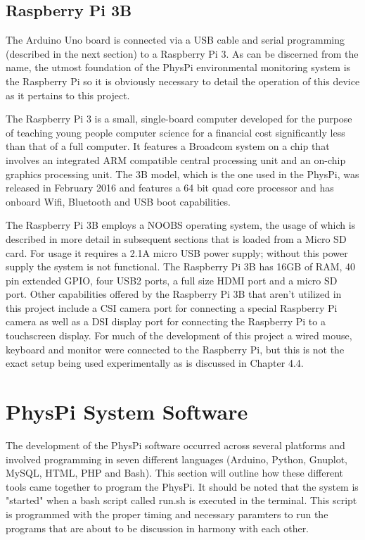 \documentclass[letterpaper, 11pt]{report}
\begin{document}
\subsection{Raspberry Pi 3B}

The Arduino Uno board is connected via a USB cable and serial programming (described in the next section) to a Raspberry Pi 3.  As can be discerned from the name, the utmost foundation of the PhysPi environmental monitoring system is the Raspberry Pi so it is obviously necessary to detail the operation of this device as it pertains to this project.

The Raspberry Pi 3 is a small, single-board computer developed for the purpose of teaching young people computer science for a financial cost significantly less than that of a full computer.  It features a Broadcom system on a chip that involves an integrated ARM compatible central processing unit and an on-chip graphics processing unit.  The 3B model, which is the one used in the PhysPi, was released in February 2016 and features a 64 bit quad core processor and has onboard Wifi, Bluetooth and USB boot capabilities. 

The Raspberry Pi 3B employs a NOOBS operating system, the usage of which is described in more detail in subsequent sections that is loaded from a Micro SD card.  For usage it requires a 2.1A micro USB power supply; without this power supply the system is not functional. The Raspberry Pi 3B has 16GB of RAM, 40 pin extended GPIO, four USB2 ports, a full size HDMI port and a micro SD port.  Other capabilities offered by the Raspberry Pi 3B that aren't utilized in this project include a CSI camera port for connecting a special Raspberry Pi camera as well as a DSI display port for connecting the Raspberry Pi to a touchscreen display.  For much of the development of this project a wired mouse, keyboard and monitor were connected to the Raspberry Pi, but this is not the exact setup being used experimentally as is discussed in Chapter 4.4.

\section{PhysPi System Software}

The development of the PhysPi software occurred across several platforms and involved programming in seven different languages (Arduino, Python, Gnuplot, MySQL, HTML, PHP and Bash).  This section will outline how these different tools came together to program the PhysPi.  It should be noted that the system is "started" when a bash script called run.sh is executed in the terminal.  This script is programmed with the proper timing and necessary paramters to run the programs that are about to be discussion in harmony with each other.
\end{document}
